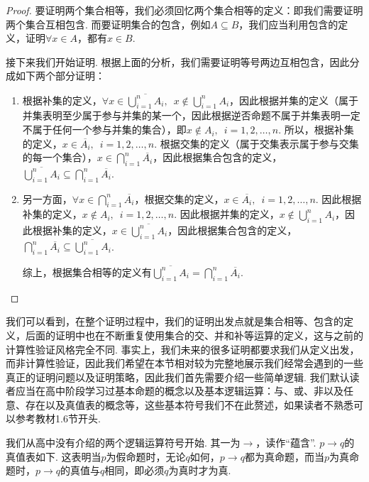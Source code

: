 \begin{proof}
    要证明两个集合相等，我们必须回忆两个集合相等的定义：即我们需要证明两个集合互相包含. 而要证明集合的包含，例如$A\subseteq B$，我们应当利用包含的定义，证明$\forall x\in A$，都有$x\in B$.

    接下来我们开始证明. 根据上面的分析，我们需要证明等号两边互相包含，因此分成如下两个部分证明：
    \begin{enumerate}
        \item 根据补集的定义，$\forall x\in \overline{\displaystyle\bigcup_{i=1}^nA_i},\enspace x\notin \bigcup_{i=1}^nA_i$，因此根据并集的定义（属于并集表明至少属于参与并集的某一个，因此根据逆否命题不属于并集表明一定不属于任何一个参与并集的集合），即$x\notin A_i,\enspace i=1,2,\ldots,n$. 所以，根据补集的定义，$x\in \overline{A_i},\enspace i=1,2,\ldots,n$. 根据交集的定义（属于交集表示属于参与交集的每一个集合），$x\in \displaystyle\bigcap_{i=1}^n\overline{A_i}$，因此根据集合包含的定义，$\overline{\displaystyle\bigcup_{i=1}^nA_i}\subseteq \bigcap_{i=1}^n\overline{A_i}$.

        \item 另一方面，$\forall x\in \displaystyle\bigcap_{i=1}^n\overline{A_i}$，根据交集的定义，$x\in \overline{A_i},\enspace i=1,2,\ldots,n$. 因此根据补集的定义，$x\notin A_i,\enspace i=1,2,\ldots,n$. 因此根据并集的定义，$x\notin \displaystyle\bigcup_{i=1}^nA_i$，因此根据补集的定义，$x\in \overline{\displaystyle\bigcup_{i=1}^nA_i}$，因此根据集合包含的定义，$\displaystyle\bigcap_{i=1}^n\overline{A_i}\subseteq \overline{\bigcup_{i=1}^nA_i}$.

              综上，根据集合相等的定义有$\overline{\displaystyle\bigcup_{i=1}^nA_i}=\bigcap_{i=1}^n\overline{A_i}$.
    \end{enumerate}
\end{proof}

我们可以看到，在整个证明过程中，我们的证明出发点就是集合相等、包含的定义，后面的证明中也在不断重复使用集合的交、并和补等运算的定义，这与之前的计算性验证风格完全不同. 事实上，我们未来的很多证明都要求我们从定义出发，而非计算性验证，因此我们希望在本节相对较为完整地展示我们经常会遇到的一些真正的证明问题以及证明策略，因此我们首先需要介绍一些简单逻辑. 我们默认读者应当在高中阶段学习过基本命题的概念以及基本逻辑运算：与、或、非以及任意、存在以及真值表的概念等，这些基本符号我们不在此赘述，如果读者不熟悉可以参考教材1.6节开头.

我们从高中没有介绍的两个逻辑运算符号开始. 其一为$\to$，读作``蕴含''. $p\to q$的真值表如下. 这表明当$p$为假命题时，无论$q$如何，$p\to q$都为真命题，而当$p$为真命题时，$p\to q$的真值与$q$相同，即必须$q$为真时才为真.

